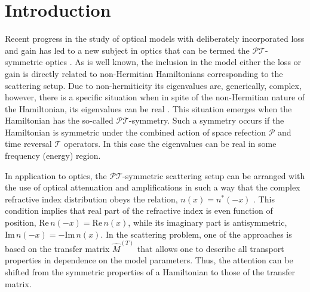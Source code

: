 \documentclass[aps,pra,reprint,showpacs,bibnotes,preprintnumbers,twoside,eqsecnum]{revtex4-1}
\begin{document}

\maketitle

\section{Introduction}
Recent progress in the study of optical models with deliberately incorporated loss and gain has led to a new subject in optics that can be termed the $\mathcal{P}\mathcal{T}$-symmetric optics \cite{1,2,3,4,5,6,KLK12}. As is well known, the inclusion in the model either the loss or gain is directly related to non-Hermitian Hamiltonians corresponding to the scattering setup. Due to non-hermiticity its eigenvalues are, generically, complex, however, there is a specific situation when in spite of the non-Hermitian nature of the Hamiltonian, its eigenvalues can be real \cite{11,12}. This situation emerges when the Hamiltonian has the so-called $\mathcal{P}\mathcal{T}$-symmetry. Such a symmetry occurs if the Hamiltonian is symmetric under the combined action of space refection $\mathcal{P}$ and time reversal $\mathcal{T}$ operators. In this case the eigenvalues can be real in some frequency (energy) region.

In application to optics, the $\mathcal{P}\mathcal{T}$-symmetric scattering setup can be arranged \cite{3,4,Ro12} with the use of optical attenuation and amplifications in such a way that the complex refractive index distribution obeys the relation, $n(x) = n^{*} (-x)$ \cite{1,2}. This condition implies that real part of the refractive index is even function of position, $\mathrm{Re}\,n(-x)=\mathrm{Re}\,n(x)$, while its imaginary part is antisymmetric, $\mathrm{Im}\,n(-x)=-\mathrm{Im}\,n(x)$. In the scattering problem, one of the approaches is based on the transfer matrix $\hat{M}^{(T)}$ that allows one to describe all transport properties in dependence on the model parameters. Thus, the attention can be shifted from the symmetric properties of a Hamiltonian to those of the transfer matrix.
\end{document}
